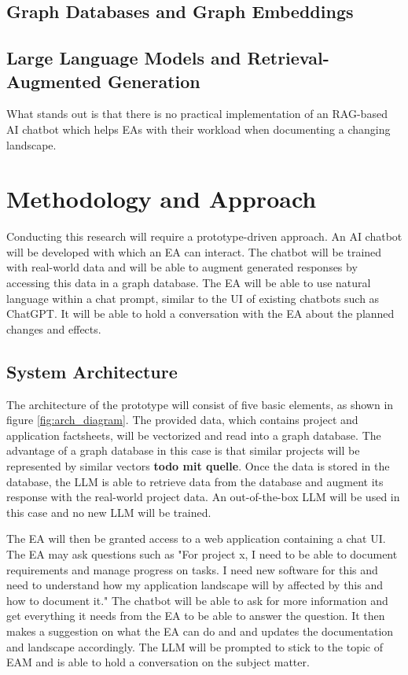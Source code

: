 \documentclass[english]{lni}
\begin{document}
\subsection{Graph Databases and Graph Embeddings}
\subsection{Large Language Models and Retrieval-Augmented Generation}


What stands out is that there is no practical implementation of an RAG-based AI chatbot which helps EAs with their workload when documenting a changing landscape.

\section{Methodology and Approach}
Conducting this research will require a prototype-driven approach. An AI chatbot will be developed with which an EA can interact. The chatbot will be trained with real-world data and will be able to augment generated responses by accessing this data in a graph database. The EA will be able to use natural language within a chat prompt, similar to the UI of existing chatbots such as ChatGPT. It will be able to hold a conversation with the EA about the planned changes and effects.

\subsection{System Architecture}
The architecture of the prototype will consist of five basic elements, as shown in figure \ref{fig:arch_diagram}. The provided data, which contains project and application factsheets, will be vectorized and read into a graph database. The advantage of a graph database in this case is that similar projects will be represented by similar vectors \textbf{todo mit quelle}. Once the data is stored in the database, the LLM is able to retrieve data from the database and augment its response with the real-world project data. An out-of-the-box LLM will be used in this case and no new LLM will be trained.

The EA will then be granted access to a web application containing a chat UI. The EA may ask questions such as "For project x, I need to be able to document requirements and manage progress on tasks. I need new software for this and need to understand how my application landscape will by affected by this and how to document it." The chatbot will be able to ask for more information and get everything it needs from the EA to be able to answer the question. It then makes a suggestion on what the EA can do and and updates the documentation and landscape accordingly. The LLM will be prompted to stick to the topic of EAM and is able to hold a conversation on the subject matter.
\end{document}
